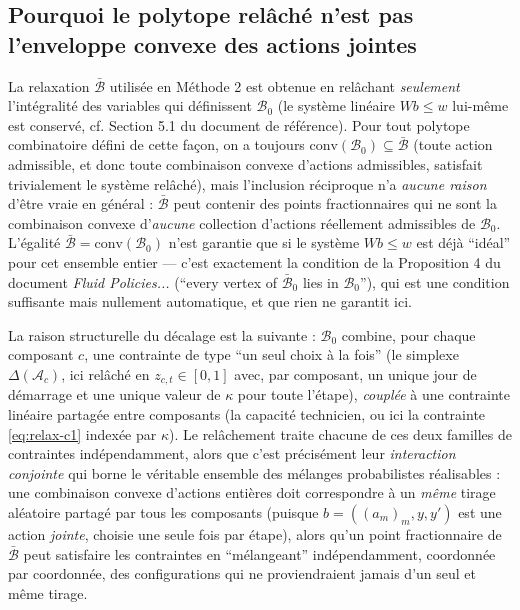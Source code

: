 \documentclass[11pt]{article}
\begin{document}
\subsection{Pourquoi le polytope relâché n'est pas l'enveloppe convexe des actions jointes}

La relaxation $\bar{\mathcal{B}}$ utilisée en Méthode 2 est obtenue en relâchant \emph{seulement}
l'intégralité des variables qui définissent $\mathcal{B}_0$ (le système linéaire $Wb\le w$ lui-même est
conservé, cf. Section 5.1 du document de référence). Pour tout polytope combinatoire défini de cette
façon, on a toujours $\mathrm{conv}(\mathcal{B}_0)\subseteq\bar{\mathcal{B}}$ (toute action admissible, et
donc toute combinaison convexe d'actions admissibles, satisfait trivialement le système relâché), mais
l'inclusion réciproque n'a \emph{aucune raison} d'être vraie en général : $\bar{\mathcal{B}}$ peut contenir
des points fractionnaires qui ne sont la combinaison convexe d'\emph{aucune} collection d'actions
réellement admissibles de $\mathcal{B}_0$. L'égalité $\bar{\mathcal{B}}=\mathrm{conv}(\mathcal{B}_0)$
n'est garantie que si le système $Wb\le w$ est déjà ``idéal'' pour cet ensemble entier --- c'est
exactement la condition de la Proposition 4 du document \emph{Fluid Policies...} (``every vertex of
$\bar{\mathcal{B}}_0$ lies in $\mathcal{B}_0$''), qui est une condition suffisante mais nullement
automatique, et que rien ne garantit ici.

La raison structurelle du décalage est la suivante : $\mathcal{B}_0$ combine, pour chaque composant $c$,
une contrainte de type ``un seul choix à la fois'' (le simplexe $\Delta(\mathcal{A}_c)$, ici relâché en
$z_{c,t}\in[0,1]$ avec, par composant, un unique jour de démarrage et une unique valeur de $\kappa$ pour
toute l'étape), \emph{couplée} à une contrainte linéaire partagée entre composants (la capacité
technicien, ou ici la contrainte \eqref{eq:relax-c1} indexée par $\kappa$). Le relâchement traite chacune
de ces deux familles de contraintes indépendamment, alors que c'est précisément leur \emph{interaction
conjointe} qui borne le véritable ensemble des mélanges probabilistes réalisables : une combinaison
convexe d'actions entières doit correspondre à un \emph{même} tirage aléatoire partagé par tous les
composants (puisque $b=((a_m)_m,y,y')$ est une action \emph{jointe}, choisie une seule fois par étape),
alors qu'un point fractionnaire de $\bar{\mathcal{B}}$ peut satisfaire les contraintes en ``mélangeant''
indépendamment, coordonnée par coordonnée, des configurations qui ne proviendraient jamais d'un seul et
même tirage.
\end{document}
